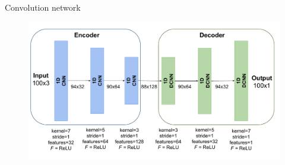 \documentclass[handout]{beamer}
\begin{document}
\begin{frame}{Convolution network}
\begin{center}
  \begin{figure}
  \includegraphics[scale=0.4]{images/motor_cnn_decoder_encoder}
  \end{figure}
\end{center}
\end{frame}

%
\end{document}
